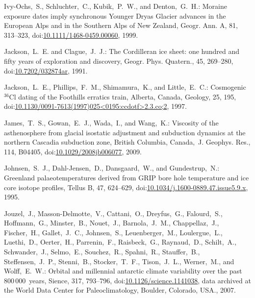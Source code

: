 \documentclass[tc, manuscript]{copernicus}
\begin{document}
\begin{thebibliography}{114}
Ivy-Ochs,~S., Schluchter,~C., Kubik,~P.~W., and Denton,~G.~H.: Moraine
exposure dates imply synchronous Younger Dryas Glacier advances in the
European Alps and in the Southern Alps of New Zealand, Geogr. Ann. A, 81,
313--323,
doi:\href{http://dx.doi.org/10.1111/1468-0459.00060}{10.1111/1468-0459.00060},
1999.


Jackson,~L.~E. and Clague,~J.~J.: The Cordilleran ice sheet: one hundred and fifty years of exploration and discovery, G{e}ogr. Phys. Quatern., 45, 269--280,
doi:\href{http://dx.doi.org/10.7202/032874ar}{10.7202/032874ar}, 1991.


Jackson,~L.~E., Phillips,~F.~M., Shimamura,~K., and Little,~E.~C.: Cosmogenic $^{36}$Cl dating of the Foothills erratics train, Alberta, Canada, Geology, 25, 195,
doi:\href{http://dx.doi.org/10.1130/0091-7613(1997)025<0195:ccdotf>2.3.co;2}{10.1130/0091-7613(1997)025\textless0195:ccdotf\textgreater2.3.co;2}, 1997.


James,~T.~S., Gowan,~E.~J., Wada,~I., and Wang,~K.: Viscosity of the
asthenosphere from glacial isostatic adjustment and subduction dynamics at
the northern Cascadia subduction zone, British Columbia, Canada,~J. Geophys.
Res., 114, B04405,
doi:\href{http://dx.doi.org/10.1029/2008jb006077}{10.1029/2008jb006077},
2009.


Johnsen,~S.~J., Dahl-Jensen,~D., Dansgaard,~W., and Gundestrup,~N.: Greenland palaeotemperatures derived from GRIP bore hole temperature and ice core isotope profiles, Tellus B, 47, 624--629,
doi:\href{http://dx.doi.org/10.1034/j.1600-0889.47.issue5.9.x}{10.1034/j.1600-0889.47.issue5.9.x}, 1995.


Jouzel,~J., Masson-Delmotte,~V., Cattani,~O., Dreyfus,~G., Falourd,~S., Hoffmann,~G., Minster,~B., Nouet,~J., Barnola,~J.~M., Chappellaz,~J., Fischer,~H., Gallet,~J.~C., Johnsen,~S., Leuenberger,~M., Loulergue,~L., Luethi,~D., Oerter,~H., Parrenin,~F., Raisbeck,~G., Raynaud,~D., Schilt,~A., Schwander,~J., Selmo,~E., Souchez,~R., Spahni,~R., Stauffer,~B., Steffensen,~J.~P., Stenni,~B., Stocker,~T.~F., Tison,~J.~L., Werner,~M., and Wolff,~E.~W.: Orbital and millennial antarctic climate variability over the past 800\,000~years, Sience, 317, 793--796,
doi:\href{http://dx.doi.org/10.1126/science.1141038}{10.1126/science.1141038}, data archived at the World Data Center for Paleoclimatology, Boulder, Colorado, USA., 2007.



\end{thebibliography}
\end{document}
